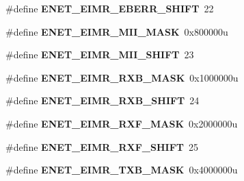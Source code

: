 \begin{DoxyCompactItemize}
\item 
\#define {\bfseries E\+N\+E\+T\+\_\+\+E\+I\+M\+R\+\_\+\+E\+B\+E\+R\+R\+\_\+\+S\+H\+I\+FT}~22\hypertarget{group__ENET__Register__Masks_ga37f7aee11fab88919e4c11f1a916bdb4}{}\label{group__ENET__Register__Masks_ga37f7aee11fab88919e4c11f1a916bdb4}

\item 
\#define {\bfseries E\+N\+E\+T\+\_\+\+E\+I\+M\+R\+\_\+\+M\+I\+I\+\_\+\+M\+A\+SK}~0x800000u\hypertarget{group__ENET__Register__Masks_ga76b5d13b0a814e6201d6d4815bf5afbd}{}\label{group__ENET__Register__Masks_ga76b5d13b0a814e6201d6d4815bf5afbd}

\item 
\#define {\bfseries E\+N\+E\+T\+\_\+\+E\+I\+M\+R\+\_\+\+M\+I\+I\+\_\+\+S\+H\+I\+FT}~23\hypertarget{group__ENET__Register__Masks_gaa6d43005c24a4fc636a2c1310aae4225}{}\label{group__ENET__Register__Masks_gaa6d43005c24a4fc636a2c1310aae4225}

\item 
\#define {\bfseries E\+N\+E\+T\+\_\+\+E\+I\+M\+R\+\_\+\+R\+X\+B\+\_\+\+M\+A\+SK}~0x1000000u\hypertarget{group__ENET__Register__Masks_gade7a0df0826b6d0c11f3b0e545e17535}{}\label{group__ENET__Register__Masks_gade7a0df0826b6d0c11f3b0e545e17535}

\item 
\#define {\bfseries E\+N\+E\+T\+\_\+\+E\+I\+M\+R\+\_\+\+R\+X\+B\+\_\+\+S\+H\+I\+FT}~24\hypertarget{group__ENET__Register__Masks_gab1b2e526363f6abb22c5d228e8bfb461}{}\label{group__ENET__Register__Masks_gab1b2e526363f6abb22c5d228e8bfb461}

\item 
\#define {\bfseries E\+N\+E\+T\+\_\+\+E\+I\+M\+R\+\_\+\+R\+X\+F\+\_\+\+M\+A\+SK}~0x2000000u\hypertarget{group__ENET__Register__Masks_gaa22528ac89efc6fe663951b8c3eac045}{}\label{group__ENET__Register__Masks_gaa22528ac89efc6fe663951b8c3eac045}

\item 
\#define {\bfseries E\+N\+E\+T\+\_\+\+E\+I\+M\+R\+\_\+\+R\+X\+F\+\_\+\+S\+H\+I\+FT}~25\hypertarget{group__ENET__Register__Masks_ga78a295cf5fe590daeb081dafd03a9155}{}\label{group__ENET__Register__Masks_ga78a295cf5fe590daeb081dafd03a9155}

\item 
\#define {\bfseries E\+N\+E\+T\+\_\+\+E\+I\+M\+R\+\_\+\+T\+X\+B\+\_\+\+M\+A\+SK}~0x4000000u\hypertarget{group__ENET__Register__Masks_ga9fddede3e716f3928faff0eb39509275}{}\label{group__ENET__Register__Masks_ga9fddede3e716f3928faff0eb39509275}


\end{DoxyCompactItemize}
